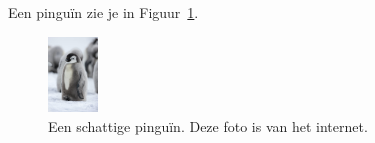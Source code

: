 \documentclass[../presentatie.tex]{subfiles}
\begin{document}
\begin{frame}{}
	\vspace{-28px}
	
	\begin{penExResult}[3cm]
		Een pinguïn zie je in Figuur~\ref{fig:pinguin}.
		\begin{figure}[h!]
			\centering
			\includegraphics[height=2cm]{assets/pinguin.jpg}
			\caption{Een schattige pinguïn. Deze foto is van het internet.}\label{fig:pinguin}
		\end{figure}
	\end{penExResult}
\end{frame}
\end{document}
